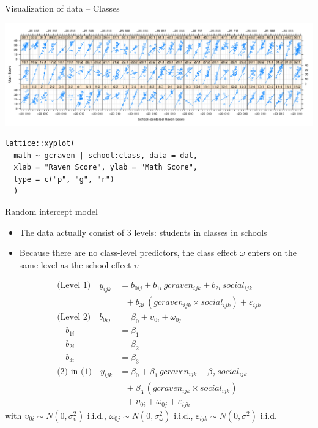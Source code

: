 \documentclass[aspectratio=169]{beamer}
\begin{document}
\begin{frame}[fragile]{Visualization of data -- Classes}
  \begin{center}
      \includegraphics[scale=.34]{../figures/jsp_lattice2}
  \end{center}
\begin{lstlisting}
lattice::xyplot(
  math ~ gcraven | school:class, data = dat,
  xlab = "Raven Score", ylab = "Math Score",
  type = c("p", "g", "r")
  )
\end{lstlisting}

\end{frame}

\begin{frame}{Random intercept model}
  \begin{itemize}
    \item The data actually consist of 3 levels: students in classes in
      schools
    \item Because there are no class-level predictors, the class effect
      $\omega$ enters on the same level as the school effect $\upsilon$
  \end{itemize}
\begin{align*}
\text{(Level 1)} \quad y_{ijk} &= b_{0ij} + b_{1i}\,gcraven_{ijk} + b_{2i}\,social_{ijk}\\
                  &~~~+ b_{3i}\,(gcraven_{ijk} \times social_{ijk}) +
                  \varepsilon_{ijk}\\
  \text{(Level 2)} \quad b_{0ij} &= \beta_0 + \upsilon_{0i} + \omega_{0j}\\
                  \quad b_{1i} &= \beta_1\\
                  \quad b_{2i} &= \beta_2\\
                  \quad b_{3i} &= \beta_3\\
\text{(2) in (1)} \quad y_{ijk} &= \beta_{0} + \beta_{1}\,gcraven_{ijk} +
  \beta_{2}\,social_{ijk}\\
                              &~~~ + \beta_{3}\,(gcraven_{ijk} \times social_{ijk})\\
                              &~~~ + \upsilon_{0i} + \omega_{0j} +
                              \varepsilon_{ijk}
\end{align*}
  \hspace{-.1cm}with $\upsilon_{0i} \sim N(0, \sigma^2_{\upsilon})$ i.i.d.,
$\omega_{0j} \sim N(0, \sigma^2_{\omega})$ i.i.d.,
$\varepsilon_{ijk} \sim N(0, \sigma^2)$ i.i.d.
\end{frame}
\end{document}
